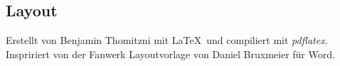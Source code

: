 \documentclass[12pt, a4paper, twoside, openany]{book}
\begin{document}
{        \subsection*{Layout}
        \begin{center}
                Erstellt von Benjamin Thomitzni mit \LaTeX~und compiliert mit \textit{pdflatex}.\\
                Inspririert von der Fanwerk Layoutvorlage von Daniel Bruxmeier für Word. \\         
        \end{center}
}
\newpage
{}%
\end{document}
